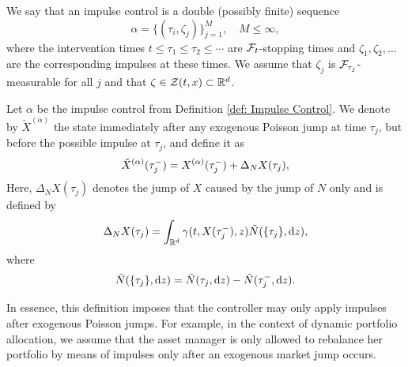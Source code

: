 \begin{definition}
\label{def: Impulse Control}
    We say that an impulse control is a double (possibly finite) sequence 
    \begin{equation*}
        \alpha= \{(\tau_i, \zeta_j)\}_{j=1}^M, \quad M \leq \infty,
    \end{equation*}
    where the intervention times $t \leq \tau_1 \leq \tau_2 \leq \cdots$ are $\mathcal{F}_t$-stopping times and $\zeta_1, \zeta_2, \ldots$ are the corresponding impulses at these times. We assume that $\zeta_j$ is $\mathcal{F}_{\tau_j}$-measurable for all $j$ and that $\zeta \in \mathcal{Z}(t,x) \subset \mathbb{R}^d$.
\end{definition}

\begin{definition}
\label{def: Post-Jump, Pre-Intervention State}
    Let $\alpha$ be the impulse control from Definition \ref{def: Impulse Control}. We denote by $\check{X}^{(\alpha)}$ the state immediately after any exogenous Poisson jump at time $\tau_j$, but before the possible impulse at $\tau_j$, and define it as
    \begin{equation*}
        \check{X}^{(\alpha)}(\tau_j^-) = X^{(\alpha)} (\tau_j^-) + \Delta_N X(\tau_j),
    \end{equation*}
    Here, $\Delta_N X(\tau_j)$ denotes the jump of $X$ caused by the jump of $N$ only and is defined by
    \begin{equation*}
        \Delta_N X(\tau_j) = \int_{\mathbb{R}^d} \gamma(t,X(\tau_j^-),z) \tilde N(\{\tau_j\}, \mathrm{d} z),
    \end{equation*}
    where 
    \begin{equation*}
        \tilde N(\{\tau_j\}, \mathrm{d} z) = \tilde N(\tau_j, \mathrm{d} z) - \tilde N(\tau_j^-, \mathrm{d} z). 
    \end{equation*}
\end{definition}
\begin{remark}
    In essence, this definition imposes that the controller may only apply impulses after exogenous Poisson jumps. For example, in the context of dynamic portfolio allocation, we assume that the asset manager is only allowed to rebalance her portfolio by means of impulses only after an exogenous market jump occurs.
\end{remark}

